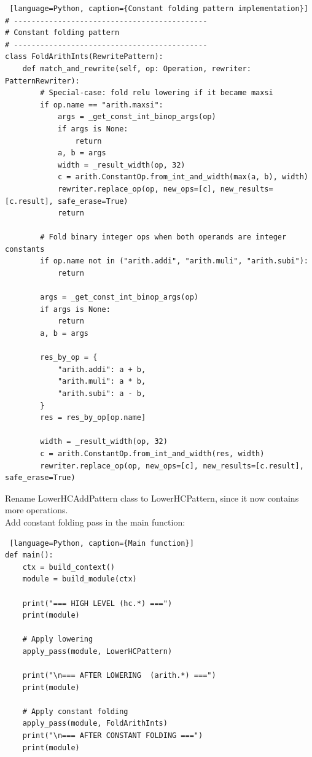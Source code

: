 \documentclass[../main.tex]{subfiles}
\begin{document}
\begin{lstlisting} [language=Python, caption={Constant folding pattern implementation}]
# --------------------------------------------
# Constant folding pattern
# --------------------------------------------
class FoldArithInts(RewritePattern):
    def match_and_rewrite(self, op: Operation, rewriter: PatternRewriter):
        # Special-case: fold relu lowering if it became maxsi
        if op.name == "arith.maxsi":
            args = _get_const_int_binop_args(op)
            if args is None:
                return
            a, b = args
            width = _result_width(op, 32)
            c = arith.ConstantOp.from_int_and_width(max(a, b), width)
            rewriter.replace_op(op, new_ops=[c], new_results=[c.result], safe_erase=True)
            return

        # Fold binary integer ops when both operands are integer constants
        if op.name not in ("arith.addi", "arith.muli", "arith.subi"):
            return

        args = _get_const_int_binop_args(op)
        if args is None:
            return
        a, b = args

        res_by_op = {
            "arith.addi": a + b,
            "arith.muli": a * b,
            "arith.subi": a - b,
        }
        res = res_by_op[op.name]

        width = _result_width(op, 32)
        c = arith.ConstantOp.from_int_and_width(res, width)
        rewriter.replace_op(op, new_ops=[c], new_results=[c.result], safe_erase=True)
\end{lstlisting}
Rename LowerHCAddPattern class to LowerHCPattern, since it now contains more operations.
\\Add constant folding pass in the main function:
\begin{lstlisting} [language=Python, caption={Main function}]
def main():
    ctx = build_context()
    module = build_module(ctx)

    print("=== HIGH LEVEL (hc.*) ===")
    print(module)

    # Apply lowering
    apply_pass(module, LowerHCPattern)

    print("\n=== AFTER LOWERING  (arith.*) ===")
    print(module)

    # Apply constant folding
    apply_pass(module, FoldArithInts)
    print("\n=== AFTER CONSTANT FOLDING ===")
    print(module)
\end{lstlisting}
\end{document}
